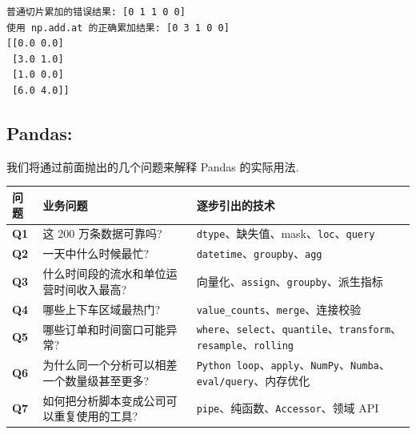 \documentclass[11pt]{article}
\begin{document}
    \begin{Verbatim}[commandchars=\\\{\}]
普通切片累加的错误结果: [0 1 1 0 0]
使用 np.add.at 的正确累加结果: [0 3 1 0 0]
[[0.0 0.0]
 [3.0 1.0]
 [1.0 0.0]
 [6.0 4.0]]
    \end{Verbatim}

    \subsection{Pandas:}\label{pandas}

    我们将通过前面抛出的几个问题来解释 Pandas 的实际用法.

{\def\LTcaptype{none} %
\begin{longtable}[]{@{}
  >{\centering\arraybackslash}p{}
  >{\centering\arraybackslash}p{}
  >{\centering\arraybackslash}p{}@{}}
\toprule\noalign{}
\begin{minipage}[b]{\linewidth}\centering
问题
\end{minipage} & \begin{minipage}[b]{\linewidth}\centering
业务问题
\end{minipage} & \begin{minipage}[b]{\linewidth}\centering
逐步引出的技术
\end{minipage} \\
\midrule\noalign{}
\endhead
\bottomrule\noalign{}
\endlastfoot
\textbf{Q1} & 这 200 万条数据可靠吗? &
\texttt{dtype}、缺失值、mask、\texttt{loc}、\texttt{query} \\
\textbf{Q2} & 一天中什么时候最忙? &
\texttt{datetime}、\texttt{groupby}、\texttt{agg} \\
\textbf{Q3} & 什么时间段的流水和单位运营时间收入最高? &
向量化、\texttt{assign}、\texttt{groupby}、派生指标 \\
\textbf{Q4} & 哪些上下车区域最热门? &
\texttt{value\_counts}、\texttt{merge}、连接校验 \\
\textbf{Q5} & 哪些订单和时间窗口可能异常? &
\texttt{where}、\texttt{select}、\texttt{quantile}、\texttt{transform}、\texttt{resample}、\texttt{rolling} \\
\textbf{Q6} & 为什么同一个分析可以相差一个数量级甚至更多? &
\texttt{Python\ loop}、\texttt{apply}、\texttt{NumPy}、\texttt{Numba}、\texttt{eval/query}、内存优化 \\
\textbf{Q7} & 如何把分析脚本变成公司可以重复使用的工具? &
\texttt{pipe}、纯函数、\texttt{Accessor}、领域 API \\
\end{longtable}
}
\end{document}
